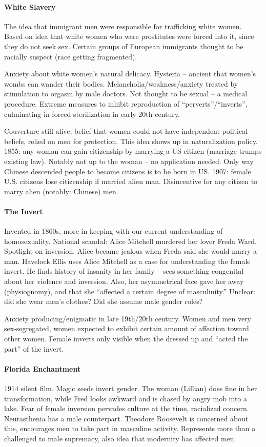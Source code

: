 \paragraph{White Slavery} The idea that immigrant men were responsible for trafficking white women. Based on idea that white women who were prostitutes were forced into it, since they do not seek sex. Certain groups of European immigrants thought to be racially suspect (race getting fragmented).

Anxiety about white women's natural delicacy. Hysteria -- ancient that women's wombs can wander their bodies. Melancholia/weakness/anxiety treated by stimulation to orgasm by male doctors. Not thought to be sexual -- a medical procedure. Extreme measures to inhibit reproduction of ``perverts''/``inverts'', culminating in forced sterilization in early 20th century.

Couverture still alive, belief that women could not have independent political beliefs, relied on men for protection. This idea shows up in naturalization policy. 1855: any woman can gain citizenship by marrying a US citizen (marriage trumps existing law). Notably not up to the woman -- no application needed. Only way Chinese descended people to become citizens is to be born in US. 1907: female U.S. citizens lose citizenship if married alien man. Disincentive for any citizen to marry alien (notably: Chinese) men.

\paragraph{The Invert} Invented in 1860s, more in keeping with our current understanding of homosexuality. National scandal: Alice Mitchell murdered her lover Freda Ward. Spotlight on inversion. Alice became jealous when Freda said she would marry a man. Havelock Ellis uses Alice Mitchell as a case for understanding the female invert. He finds history of insanity in her family -- sees something congenital about her violence and inversion. Also, her asymmetrical face gave her away (physiognomy), and that she ``affected a certain degree of masculinity.'' Unclear: did she wear men's clothes? Did she assume male gender roles?

Anxiety producing/enigmatic in late 19th/20th century. Women and men very sex-segregated, women expected to exhibit certain amount of affection toward other women. Female inverts only visible when the dressed up and ``acted the part'' of the invert.

\paragraph{Florida Enchantment} 1914 silent film. Magic seeds invert gender. The woman (Lillian) does fine in her transformation, while Fred looks awkward and is chased by angry mob into a lake. Fear of female inversion pervades culture at the time, racialized concern. Neurasthenia has a male counterpart. Theodore Roosevelt is concerned about this, encourages men to take part in masculine activity. Represents more than a challenged to male supremacy, also idea that modernity has affected men.

